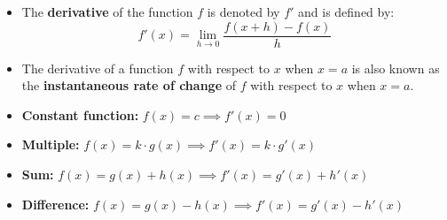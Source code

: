 \documentclass[12pt,a4paper,titlepage]{article}
\begin{document}
            \begin{SummaryBox}[title=Differentiation from first principles]
                \begin{itemize}[leftmargin=*]
                    \item The \textbf{derivative} of the function $f$ is denoted by $f'$ and is defined by:
                    \[
                        f'(x) = \lim\limits_{h \to 0} \frac{f(x+h) - f(x)}{h}
                    \]
                    \item The derivative of a function $f$ with respect to $x$ when $x=a$ is also known as the \textbf{instantaneous rate of change} of $f$ with respect to $x$ when $x=a$.
                \end{itemize}
            \end{SummaryBox}
            
            \begin{SummaryBox}[title=Derivative rules]
                \begin{SummaryExtensionBox}[title=Differentiation results]
                    \begin{itemize}[leftmargin=*]
                        \item \textbf{Constant function:} $f(x) = c \implies f'(x) = 0$
                        \item \textbf{Multiple:} $f(x) = k \cdot g(x) \implies f'(x) = k \cdot g'(x)$
                        \item \textbf{Sum:} $f(x) = g(x) + h(x) \implies f'(x) = g'(x) + h'(x)$
                        \item \textbf{Difference:} $f(x) = g(x) - h(x) \implies f'(x) = g'(x) - h'(x)$
                    \end{itemize}
                \end{SummaryExtensionBox}
            \end{SummaryBox}
            
\end{document}
